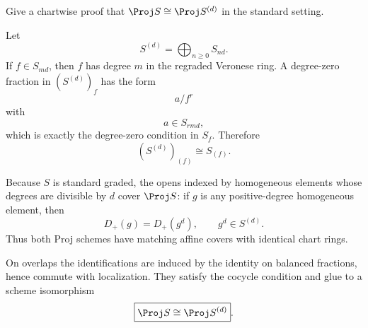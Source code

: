 \begin{problem}\label{prob:vi35-10}
Give a chartwise proof that \(\Proj S\cong\Proj S^{(d)}\) in the standard setting.
\end{problem}

\ifdefined\FullProblemDossiers
\begin{solution}
Let
\[
S^{(d)}=\bigoplus_{n\ge0}S_{nd}.
\]
If \(f\in S_{md}\), then \(f\) has degree \(m\) in the regraded Veronese ring. A degree-zero fraction in
\((S^{(d)})_f\) has the form
\[
a/f^r
\]
with
\[
a\in S_{rmd},
\]
which is exactly the degree-zero condition in \(S_f\). Therefore
\[
\boxed{
(S^{(d)})_{(f)}\cong S_{(f)}.
}
\]

Because \(S\) is standard graded, the opens indexed by homogeneous elements whose degrees are divisible by \(d\)
cover \(\Proj S\): if \(g\) is any positive-degree homogeneous element, then
\[
D_+(g)=D_+(g^d),
\qquad
g^d\in S^{(d)}.
\]
Thus both Proj schemes have matching affine covers with identical chart rings.

On overlaps the identifications are induced by the identity on balanced fractions, hence commute with localization.
They satisfy the cocycle condition and glue to a scheme isomorphism
\[
\boxed{\Proj S\cong\Proj S^{(d)}}.
\]
\end{solution}
\fi
